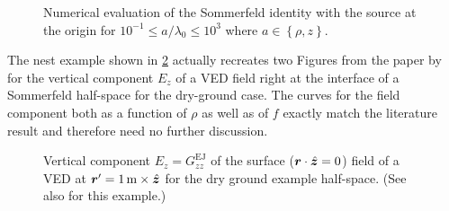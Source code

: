 \begin{figure}
    \caption[Numerical evaluation of the Sommerfeld identity]
    {Numerical evaluation of the Sommerfeld identity with the source at
    the origin for $10^{-1} \leq a / \lambda_0 \leq 10^{3}$ where
    $a \in \left\{ \rho, z \right\}$.}
    \label{fig:somm_id_ref_time}
\end{figure}




The nest example shown in \cref{fig:surface_E_z_of_rho_and_f_axial_transmission}
actually recreates two Figures from the paper by \textcite{Michalski2016b}
for the vertical component $E_z$ of a \ac{VED} field right at the interface
of a Sommerfeld half-space for the dry-ground case.
The curves for the field component both as a function of $\rho$ as well as of
$f$ exactly match the literature result and therefore need no further
discussion.

\begin{figure}
    \newcommand{\widthFactor}{0.47}
    \newcommand{\heightFactor}{0.35}
    \centering
        \caption[]{Vertical component $E_z = G^\mathrm{EJ}_{zz}$ of the surface
        ($\robs \cdot \uv{z} = 0$) field of a \ac{VED} at
        $\rsrc = \SI{1}{\metre} \times \uv{z}$ for the dry ground example
        half-space.
        (See also \textcite{Michalski2016b} for this example.)}
        \label{fig:surface_E_z_of_rho_and_f_axial_transmission}
\end{figure}


